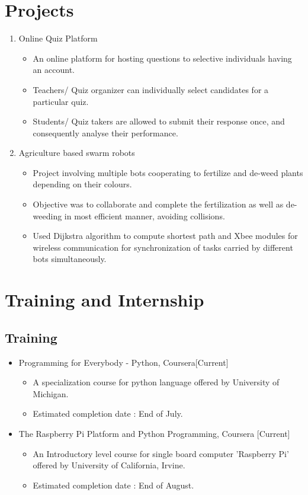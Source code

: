 \documentclass[11pt,a4paper,sans]{moderncv}        %
\begin{document}
\section{Projects}
\begin{enumerate}
	\item Online Quiz Platform 
	\begin{itemize}
		\item An online platform for hosting questions to selective individuals having an account.
		\item Teachers/ Quiz organizer can individually select candidates for a particular quiz.
		\item Students/ Quiz takers are allowed to submit their response once, and consequently analyse their performance. 
	\end{itemize}
    \item Agriculture based swarm robots
    \begin{itemize}
    	\item Project involving multiple bots cooperating to fertilize and de-weed plants depending on their colours. 
    	\item Objective was to collaborate and complete the fertilization as well as de-weeding in most efficient manner, avoiding collisions.  
    	\item Used Dijkstra algorithm to compute shortest path and Xbee modules for wireless communication for synchronization of tasks carried by different bots simultaneously. 
    \end{itemize}
\end{enumerate}
\section{Training and Internship}
\subsection{Training}
\begin{itemize}
	\item Programming for Everybody - Python, Coursera[Current] 
	\begin{itemize}
		\item A specialization course for python language offered by University of Michigan.
		\item Estimated completion date : End of July.
	\end{itemize}
	\item The Raspberry Pi Platform and Python Programming, Coursera [Current]
	 	\begin{itemize}
	 	\item An Introductory level course for single board computer 'Raspberry Pi' offered by University of California, Irvine.
	 	\item Estimated completion date : End of August.
	 \end{itemize}
\end{itemize}
\end{document}
